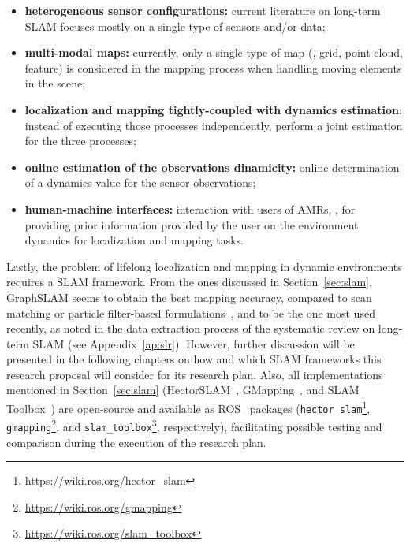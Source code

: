 \begin{itemize}[nosep]
\item \textbf{heterogeneous sensor configurations:} current literature on long-term \gls{SLAM} focuses mostly on a single type of sensors and/or data;
\item \textbf{multi-modal maps:} currently, only a single type of map (\eg, grid, point cloud, feature) is considered in the mapping process when handling moving elements in the scene;
\item \textbf{localization and mapping tightly-coupled with dynamics estimation}: instead of executing those processes independently, perform a joint estimation for the three processes;
\item \textbf{online estimation of the observations dinamicity:} online determination of a dynamics value for the sensor observations;
\item \textbf{human-machine interfaces:} interaction with users of \glspl{AMR}, \eg, for providing prior information provided by the user on the environment dynamics for localization and mapping tasks.
\end{itemize}

Lastly, the problem of lifelong localization and mapping in dynamic environments requires a \gls{SLAM} framework. From the ones discussed in Section~\ref{sec:slam}, GraphSLAM seems to obtain the best mapping accuracy, compared to scan matching or particle filter-based formulations~\cite{review:bresson:2017}, and to be the one most used recently, as noted in the data extraction process of the systematic review on long-term SLAM (see Appendix~\ref{ap:slr}).
However, further discussion will be presented in the following chapters on how and which \gls{SLAM} frameworks this research proposal will consider for its research plan.
Also, all implementations mentioned in Section~\ref{sec:slam} (HectorSLAM~\cite{slam:scan-match:hector}, GMapping~\cite{slam:pf:gmapping}, and \gls{SLAM} Toolbox~\cite{slam:graph:slam-toolbox}) are open-source and available as ROS~\cite{ros,ros2} packages (\texttt{hector\_slam}\footnote{\url{https://wiki.ros.org/hector_slam}}, \texttt{gmapping}\footnote{\url{https://wiki.ros.org/gmapping}}, and \texttt{slam\_toolbox}\footnote{\url{https://wiki.ros.org/slam_toolbox}}, respectively), facilitating possible testing and comparison during the execution of the research plan.
